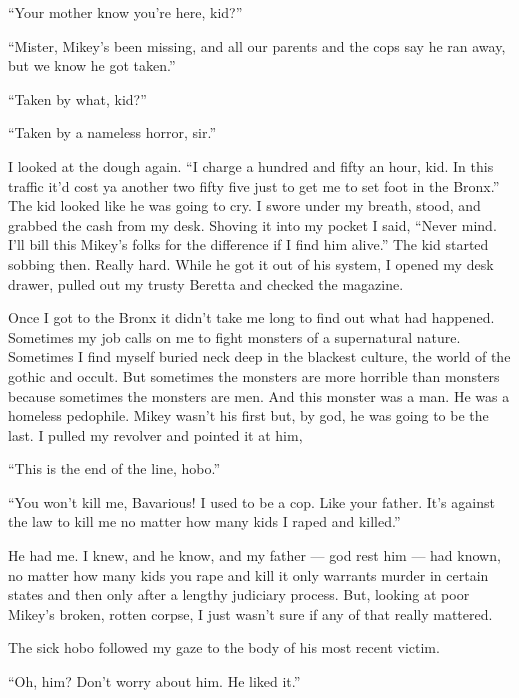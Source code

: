 ``Your mother know you're here, kid?''

``Mister, Mikey's been missing, and all our parents and
the cops say he ran away, but we know he got taken.''

``Taken by what, kid?''

``Taken by a nameless horror, sir.''



I looked at the dough again. ``I charge a hundred and fifty an
hour, kid. In this traffic it'd cost ya another two fifty
five just to get me to set foot in the Bronx.'' The kid looked
like he was going to cry. I swore under my breath, stood, and
grabbed the cash from my desk. Shoving it into my pocket I said,
``Never mind. I'll bill this Mikey's folks for the
difference if I find him alive.'' The kid started sobbing
then. Really hard. While he got it out of his system, I opened my
desk drawer, pulled out my trusty Beretta and checked the
magazine.



Once I got to the Bronx it didn't take me long to find out
what had happened. Sometimes my job calls on me to fight monsters
of a supernatural nature. Sometimes I find myself buried neck deep
in the blackest culture, the world of the gothic and occult. But
sometimes the monsters are more horrible than monsters because
sometimes the monsters are men. And this monster was a man. He was
a homeless pedophile. Mikey wasn't his first but, by god, he
was going to be the last. I pulled my revolver and pointed it at
him,



``This is the end of the line, hobo.''

``You won't kill me, Bavarious! I used to be a cop. Like
your father. It's against the law to kill me no matter how
many kids I raped and killed.''

He had me. I knew, and he know, and my father --- god rest him
--- had known, no matter how many kids you rape and kill it
only warrants murder in certain states and then only after a
lengthy judiciary process. But, looking at poor Mikey's
broken, rotten corpse, I just wasn't sure if any of that
really mattered.



The sick hobo followed my gaze to the body of his most recent
victim.



``Oh, him? Don't worry about him. He liked
it.''



